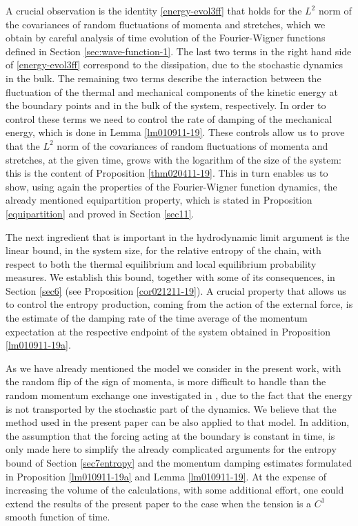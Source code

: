 \documentclass[EJP]{ejpecp} %
\numberwithin{equation}{section}
\begin{document}
A crucial observation is the identity \eqref{energy-evol3ff} that
holds for the $L^2$ norm of the covariances of  random fluctuations
of momenta and stretches, which we obtain by careful analysis of time
evolution of the Fourier-Wigner functions defined in Section
\ref{sec:wave-function-1}. The last two terms in the right hand side
of \eqref{energy-evol3ff} correspond to the dissipation, due to the
stochastic dynamics in the bulk. The remaining two
terms describe the interaction between the fluctuation of the thermal and
mechanical components of the kinetic
energy  
at the boundary points and in the bulk of the system, respectively. In
order to control these terms we need to control the rate of damping of
the mechanical energy, which is done in  
Lemma \ref{lm010911-19}. These controls allow us to prove that the
$L^2$ norm of the covariances of  random fluctuations of momenta and
stretches, at the given time, grows with the logarithm of the size of the
system: this is the content of Proposition \ref{thm020411-19}. This in turn enables us to show, using again the properties of
the  Fourier-Wigner function
dynamics, the already mentioned
equipartition property, which is stated in Proposition \ref{equipartition} and proved in Section \ref{sec11}.  


The next ingredient that is important in the hydrodynamic limit
argument is the linear bound, in the system size, for the relative
entropy of the chain, with respect to both the thermal equilibrium and local
equilibrium probability measures. We establish this bound, together
with some of its consequences,  in Section \ref{sec6} (see Proposition \ref{cor021211-19}). A crucial
property that allows us to control the entropy production, coming from
the action of the external force, is the estimate of the damping rate
of the time average of the  momentum expectation  at the
respective endpoint of the system obtained in Proposition \ref{lm010911-19a}.


As we have already mentioned the model we consider in the present work,
with the random flip of the sign of momenta,
is  more difficult to handle than the random momentum exchange one
investigated in \cite{kos2}, due to the fact that the
energy is not transported by  the
stochastic part of the dynamics. We believe that the method used in
the  present
paper can be also applied to that model. In addition, the assumption that the
forcing acting at the boundary is constant in time, is only made here to
simplify the already complicated arguments for the entropy bound
of Section \ref{sec7entropy} and  the momentum
damping estimates formulated in  Proposition  \ref{lm010911-19a} and
Lemma \ref{lm010911-19}. At the expense of increasing the volume of
the calculations, with some additional effort, one could extend
the results of the present paper to the case when the tension is a $C^1$ smooth function of
time.
\end{document}
